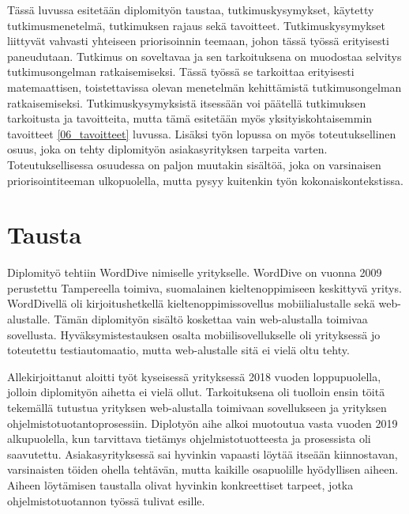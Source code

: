 Tässä luvussa esitetään diplomityön taustaa, tutkimuskysymykset, käytetty tutkimusmenetelmä, tutkimuksen rajaus sekä tavoitteet.
Tutkimuskysymykset liittyvät vahvasti yhteiseen priorisoinnin teemaan, johon tässä työssä erityisesti paneudutaan.
Tutkimus on soveltavaa ja sen tarkoituksena on muodostaa selvitys tutkimusongelman ratkaisemiseksi.
Tässä työssä se tarkoittaa erityisesti matemaattisen, toistettavissa olevan menetelmän kehittämistä tutkimusongelman ratkaisemiseksi.
Tutkimuskysymyksistä itsessään voi päätellä tutkimuksen tarkoitusta ja tavoitteita, mutta tämä esitetään myös yksityiskohtaisemmin tavoitteet \ref{06_tavoitteet} luvussa.
Lisäksi työn lopussa on myös toteutuksellinen osuus, joka on tehty diplomityön asiakasyrityksen tarpeita varten.
Toteutuksellisessa osuudessa on paljon muutakin sisältöä, joka on varsinaisen priorisointiteeman ulkopuolella, mutta pysyy kuitenkin työn kokonaiskontekstissa.

\section{Tausta} \label{06_tausta}

Diplomityö tehtiin WordDive nimiselle yritykselle. WordDive on vuonna 2009 perustettu Tampereella toimiva, suomalainen kieltenoppimiseen keskittyvä yritys. WordDivellä oli kirjoitushetkellä kieltenoppimissovellus mobiilialustalle sekä web-alustalle.
Tämän diplomityön sisältö koskettaa vain web-alustalla toimivaa sovellusta.
Hyväksymistestauksen osalta mobiilisovellukselle oli yrityksessä jo toteutettu testiautomaatio, mutta web-alustalle sitä ei vielä oltu tehty.

Allekirjoittanut aloitti työt kyseisessä yrityksessä 2018 vuoden loppupuolella, jolloin diplomityön aihetta ei vielä ollut.
Tarkoituksena oli tuolloin ensin töitä tekemällä tutustua yrityksen web-alustalla toimivaan sovellukseen ja yrityksen ohjelmistotuotantoprosessiin.
Diplotyön aihe alkoi muotoutua vasta vuoden 2019 alkupuolella, kun tarvittava tietämys ohjelmistotuotteesta ja prosessista oli saavutettu.
Asiakasyrityksessä sai hyvinkin vapaasti löytää itseään kiinnostavan, varsinaisten töiden ohella tehtävän, mutta kaikille osapuolille hyödyllisen aiheen.
Aiheen löytämisen taustalla olivat hyvinkin konkreettiset tarpeet, jotka ohjelmistotuotannon työssä tulivat esille.

